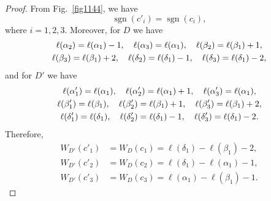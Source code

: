 \documentclass[12pt]{amsart}
\theoremstyle{noparens}
\numberwithin{equation}{section}
\numberwithin{equation}{section}
\begin{document}
\begin{proof}
	From Fig.~\ref{fig1144}, we have 
	\begin{equation}
		\operatorname{sgn}(c'_i)=\operatorname{sgn}(c_i), \label{2.2}
	\end{equation}
	where $i=1,2,3$. Moreover, for $D$ we have 
	$$
	\begin{gathered}
		\ell(\alpha_2)=\ell(\alpha_1)-1, \quad \ell(\alpha_3)=\ell(\alpha_1), \quad 
		\ell(\beta_2)=\ell(\beta_1)+1,  \cr 
		\ell(\beta_3)=\ell(\beta_1)+2, \quad  \ell(\delta_2)=\ell(\delta_1)-1, \quad
		\ell(\delta_3)=\ell(\delta_1)-2, 
	\end{gathered}
	$$
	and for $D'$ we have
	$$
	\begin{gathered}	
		\ell(\alpha'_1)=\ell(\alpha_1), \quad 
		\ell(\alpha'_2)=\ell(\alpha_1)+1, \quad  
		\ell(\alpha'_3)=\ell(\alpha_1), \cr 
		\ell(\beta'_1)=\ell(\beta_1), \quad
		\ell(\beta'_2)=\ell(\beta_1)+1, \quad   
		\ell(\beta'_3)=\ell(\beta_1)+2, \cr
		\ell(\delta'_1)=\ell(\delta_1), \quad 
		\ell(\delta'_2)=\ell(\delta_1)-1, \quad 
		\ell(\delta'_3)=\ell(\delta_1)-2.
	\end{gathered}
	$$
	Therefore,
	\begin{align}
		W_{D'}(c'_1) &= W_D(c_1) = \ell(\delta_1)-\ell(\beta_1)-2, \label{2.3} \\
		W_{D'}(c'_2) &= W_D(c_2) = \ell(\delta_1)-\ell(\alpha_1)-1, \label{2.4} \\
		W_{D'}(c'_3) &= W_D(c_3) = \ell(\alpha_1)-\ell(\beta_1)-1.  \label{2.5} 
	\end{align}
	

\end{proof}
\end{document}
